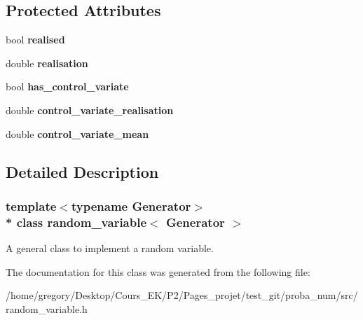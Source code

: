 \subsection*{Protected Attributes}
\begin{DoxyCompactItemize}
\item 
bool {\bfseries realised}\hypertarget{classrandom__variable_a94420df0549a9276fa277e55cd9f8a5c}{}\label{classrandom__variable_a94420df0549a9276fa277e55cd9f8a5c}

\item 
double {\bfseries realisation}\hypertarget{classrandom__variable_a5b1d23131a974247dad648dd36c90732}{}\label{classrandom__variable_a5b1d23131a974247dad648dd36c90732}

\item 
bool {\bfseries has\+\_\+control\+\_\+variate}\hypertarget{classrandom__variable_a0ef52eaf585e41eba031152727eddffa}{}\label{classrandom__variable_a0ef52eaf585e41eba031152727eddffa}

\item 
double {\bfseries control\+\_\+variate\+\_\+realisation}\hypertarget{classrandom__variable_afdb60c3268e929b2878fb71576e9544e}{}\label{classrandom__variable_afdb60c3268e929b2878fb71576e9544e}

\item 
double {\bfseries control\+\_\+variate\+\_\+mean}\hypertarget{classrandom__variable_abeb7535675f902615adda823bb6786cd}{}\label{classrandom__variable_abeb7535675f902615adda823bb6786cd}

\end{DoxyCompactItemize}


\subsection{Detailed Description}
\subsubsection*{template$<$typename Generator$>$\\*
class random\+\_\+variable$<$ Generator $>$}

A general class to implement a random variable. 

The documentation for this class was generated from the following file\+:\begin{DoxyCompactItemize}
\item 
/home/gregory/\+Desktop/\+Cours\+\_\+\+E\+K/\+P2/\+Pages\+\_\+projet/test\+\_\+git/proba\+\_\+num/src/random\+\_\+variable.\+h\end{DoxyCompactItemize}
